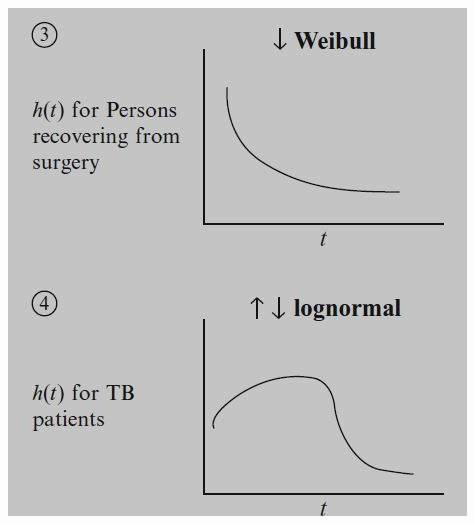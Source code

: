 \documentclass{beamer}
\theoremstyle{definition}
\begin{document}
\begin{frame}
\begin{columns}
\begin{column}{0.48\textwidth}
         \includegraphics[width =\textwidth]{Hazards3.JPG}
    \end{column}
\end{columns}
\end{frame}
\end{document}
